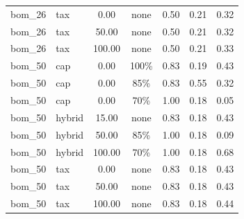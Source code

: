 \begin{table}[!htbp]
\begin{tabular}{llccccc}
bom\_26 & tax & 0.00 & none & 0.50 & 0.21 & 0.32 \\
bom\_26 & tax & 50.00 & none & 0.50 & 0.21 & 0.32 \\
bom\_26 & tax & 100.00 & none & 0.50 & 0.21 & 0.33 \\
bom\_50 & cap & 0.00 & 100\% & 0.83 & 0.19 & 0.43 \\
bom\_50 & cap & 0.00 & 85\% & 0.83 & 0.55 & 0.32 \\
bom\_50 & cap & 0.00 & 70\% & 1.00 & 0.18 & 0.05 \\
bom\_50 & hybrid & 15.00 & none & 0.83 & 0.18 & 0.43 \\
bom\_50 & hybrid & 50.00 & 85\% & 1.00 & 0.18 & 0.09 \\
bom\_50 & hybrid & 100.00 & 70\% & 1.00 & 0.18 & 0.68 \\
bom\_50 & tax & 0.00 & none & 0.83 & 0.18 & 0.43 \\
bom\_50 & tax & 50.00 & none & 0.83 & 0.18 & 0.43 \\
bom\_50 & tax & 100.00 & none & 0.83 & 0.18 & 0.44 \\
\bottomrule
\end{tabular}
\end{table}
